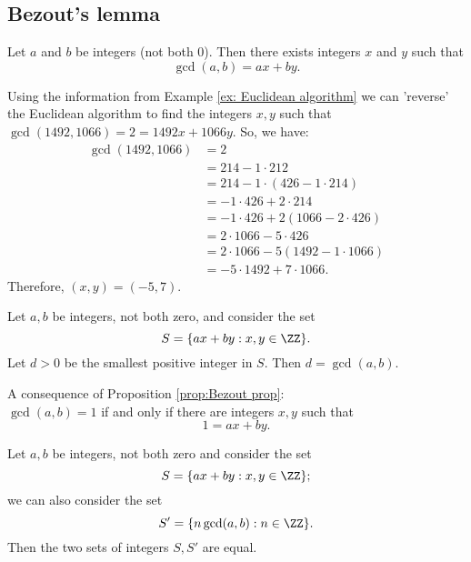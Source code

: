 \documentclass[12pt, a4paper]{article}
\begin{document}
\subsection{Bezout's lemma}

\begin{mdthm}
Let \(a\) and \(b\) be integers (not both \(0\)). Then there exists integers \(x\) and \(y\) such that 
\[\gcd(a,b)= ax+by.\]
\end{mdthm}

\begin{mdexample}
Using the information from Example \ref*{ex: Euclidean algorithm} we can 'reverse' the Euclidean algorithm to find the integers \(x,y\) such that \(\gcd(1492,1066) = 2 = 1492x+1066y\). So, we have:
\[\begin{aligned}
    \gcd(1492,1066) &= 2 \\
                    &= 214 - 1\cdot 212 \\
                    &= 214 - 1 \cdot (426-1\cdot 214) \\
                    &= -1\cdot 426 + 2\cdot 214 \\
                    &= -1 \cdot 426 + 2(1066 -2 \cdot 426) \\
                    &=2 \cdot 1066 - 5\cdot 426 \\
                    &= 2\cdot 1066 - 5(1492 -1\cdot 1066) \\
                    &= -5 \cdot 1492 +7 \cdot 1066.
\end{aligned}\]
Therefore, \((x,y)=(-5,7)\).
\end{mdexample}

\begin{proposition}\label{prop:Bezout prop}
    Let \(a,b\) be integers, not both zero, and consider the set 
    \[S=\{ax+by : x,y \in \ZZ\}.\]
    Let \(d>0\) be the smallest positive integer in \(S\). Then \(d=\gcd(a,b)\).
\end{proposition}

\begin{mdremark}
A consequence of Proposition \ref*{prop:Bezout prop}: \\
\(\gcd(a,b)=1\) if and only if there are integers \(x,y\) such that \[1=ax+by.\]
\end{mdremark}

\begin{corollary}
    Let \(a,b\) be integers, not both zero and consider the set 
    \[S =\{ax+by : x,y \in \ZZ\};\]
    we can also consider the set 
    \[S'=\{n\gcd(a,b) : n\in \ZZ\}.\]
    Then the two sets of integers \(S,S'\) are equal.
\end{corollary}
\end{document}
